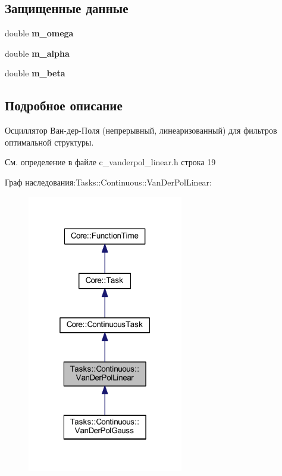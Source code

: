 \subsection*{Защищенные данные}
\begin{DoxyCompactItemize}
\item 
\hypertarget{class_tasks_1_1_continuous_1_1_van_der_pol_linear_a32bc8a8ea2d48bbee7cb368511d19bc5}{}\label{class_tasks_1_1_continuous_1_1_van_der_pol_linear_a32bc8a8ea2d48bbee7cb368511d19bc5} 
double {\bfseries m\+\_\+omega}
\item 
\hypertarget{class_tasks_1_1_continuous_1_1_van_der_pol_linear_a1054e1ea7e2459ac378fddb763077226}{}\label{class_tasks_1_1_continuous_1_1_van_der_pol_linear_a1054e1ea7e2459ac378fddb763077226} 
double {\bfseries m\+\_\+alpha}
\item 
\hypertarget{class_tasks_1_1_continuous_1_1_van_der_pol_linear_adf8894890b4e4a7d05c450ce145d69b9}{}\label{class_tasks_1_1_continuous_1_1_van_der_pol_linear_adf8894890b4e4a7d05c450ce145d69b9} 
double {\bfseries m\+\_\+beta}
\end{DoxyCompactItemize}


\subsection{Подробное описание}
Осциллятор Ван-\/дер-\/Поля (непрерывный, линеаризованный) для фильтров оптимальной структуры. 

См. определение в файле c\+\_\+vanderpol\+\_\+linear.\+h строка 19



Граф наследования\+:Tasks\+:\+:Continuous\+:\+:Van\+Der\+Pol\+Linear\+:
\nopagebreak
\begin{figure}[H]
\begin{center}
\leavevmode
\includegraphics[width=193pt]{class_tasks_1_1_continuous_1_1_van_der_pol_linear__inherit__graph}
\end{center}
\end{figure}



